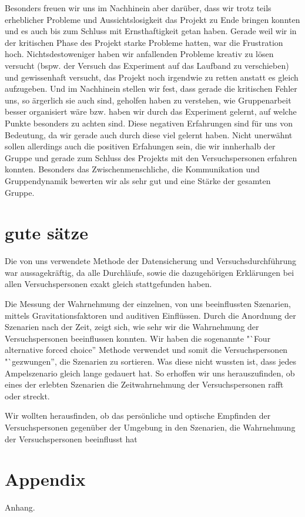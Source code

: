 \documentclass{Bericht}
\begin{document}
Besonders freuen wir uns im Nachhinein aber darüber, dass wir trotz teils erheblicher Probleme und Aussichtslosigkeit das Projekt zu Ende bringen konnten und es auch bis zum Schluss mit Ernsthaftigkeit getan haben. Gerade weil wir in der kritischen Phase des Projekt starke Probleme hatten, war die Frustration hoch. Nichtsdestoweniger haben wir anfallenden Probleme kreativ zu lösen versucht (bspw. der Versuch das Experiment auf das Laufband zu verschieben) und gewissenhaft versucht, das Projekt noch irgendwie zu retten anstatt es gleich aufzugeben. Und im Nachhinein stellen wir fest, dass gerade die kritischen Fehler uns, so ärgerlich sie auch sind, geholfen haben zu verstehen, wie Gruppenarbeit besser organisiert wäre bzw. haben wir durch das Experiment gelernt, auf welche Punkte besonders zu achten sind. Diese negativen Erfahrungen sind für uns von Bedeutung, da wir gerade auch durch diese viel gelernt haben.
Nicht unerwähnt sollen allerdings auch die positiven Erfahungen sein, die wir innherhalb der Gruppe und gerade zum Schluss des Projekts mit den Versuchspersonen erfahren konnten. Besonders das Zwischenmenschliche, die Kommunikation und Gruppendynamik bewerten wir als sehr gut und eine Stärke der gesamten Gruppe. 


\section{gute sätze}
 Die von uns verwendete Methode der Datensicherung und Versuchsdurchführung war aussagekräftig, da alle Durchläufe, sowie die dazugehörigen Erklärungen bei allen Versuchspersonen exakt gleich stattgefunden haben.



Die Messung der Wahrnehmung der einzelnen, von uns beeinflussten Szenarien, mittels Gravitationsfaktoren und auditiven Einflüssen. Durch die Anordnung der Szenarien nach der Zeit, zeigt sich, wie sehr wir die Wahrnehmung der Versuchspersonen beeinflussen konnten.  Wir haben die sogenannte "`Four alternative forced choice'' Methode verwendet und somit die Versuchspersonen "`gezwungen'', die Szenarien zu sortieren. Was diese nicht wussten ist, dass jedes Ampelszenario gleich lange gedauert hat. So erhoffen wir uns herauszufinden, ob eines der erlebten Szenarien die Zeitwahrnehmung der Versuchspersonen rafft oder streckt.	




Wir wollten herausfinden, ob das persönliche und optische Empfinden der Versuchspersonen gegenüber der Umgebung in den Szenarien, die Wahrnehmung der Versuchspersonen beeinflusst hat

\newpage
\section{Appendix} %
	Anhang.
	
\vfill %

\printbibliography
\end{document}
